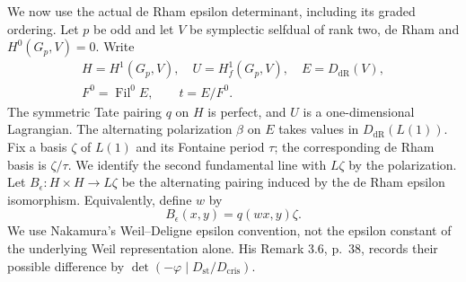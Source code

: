 We now use the actual de Rham epsilon determinant,
including its graded ordering.  Let $p$ be odd and let
$V$ be symplectic selfdual of rank two, de Rham and
$H^0(G_p,V)=0$.  Write
\[
 \begin{gathered}
 H=H^1(G_p,V),\quad U=H_f^1(G_p,V),\quad E=D_{\mathrm{dR}}(V),\\
 F^0=\operatorname{Fil}^0E,\qquad t=E/F^0.
 \end{gathered}
\]
The symmetric Tate pairing $q$ on $H$ is perfect, and
$U$ is a one-dimensional Lagrangian.  The alternating
polarization $\beta$ on $E$ takes values in
$D_{\mathrm{dR}}(L(1))$.  Fix a basis $\zeta$ of
$L(1)$ and its Fontaine period $\tau$; the corresponding
de Rham basis is $\zeta/\tau$.  We identify the second
fundamental line with $L\zeta$ by the polarization.
Let $B_\epsilon:H\times H\to L\zeta$ be the alternating
pairing induced by the de Rham epsilon isomorphism.
Equivalently, define $w$ by
\[
                  B_\epsilon(x,y)=q(wx,y)\zeta.
\]
We use Nakamura's Weil--Deligne epsilon convention,
not the epsilon constant of the underlying Weil
representation alone.  His Remark 3.6, p.~38, records
their possible difference by
$\det(-\varphi\mid D_{\mathrm{st}}/D_{\mathrm{cris}})$.

